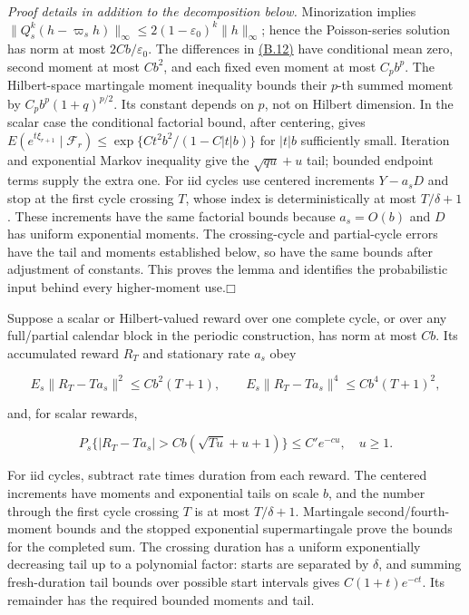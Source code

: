 \documentclass[11pt]{article}
\providecommand{\square}{\mdlgwhtsquare}
\begin{document}
\emph{Proof details in addition to the decomposition below.} Minorization implies
\(\|Q_s^k(h-\varpi_sh)\|_\infty\le 2(1-\varepsilon_0)^k\|h\|_\infty\);
hence the Poisson-series solution has norm at most \(2Cb/\varepsilon_0\). The differences in \hyperref[eq:B.12]{(B.12)} have conditional mean zero, second moment at most \(C b^2\), and each fixed even moment at most \(C_pb^p\). The Hilbert-space martingale moment inequality bounds their \(p\)-th summed moment by \(C_pb^p(1+q)^{p/2}\). Its constant depends on \(p\), not on Hilbert dimension. In the scalar case the conditional factorial bound, after centering, gives
\(E(e^{t\xi_{r+1}}\mid\mathcal F_r)\le
\exp\{C t^2b^2/(1-C|t|b)\}\) for \(|t|b\) sufficiently small.
Iteration and exponential Markov inequality give the \(\sqrt{qu}+u\) tail; bounded endpoint terms supply the extra one. For iid cycles use centered increments \(Y-a_sD\) and stop at the first cycle crossing \(T\), whose index is deterministically at most \(T/\delta+1\). These increments have the same factorial bounds because \(a_s=O(b)\) and \(D\) has uniform exponential moments. The crossing-cycle and partial-cycle errors have the tail and moments established below, so have the same bounds after adjustment of constants. This proves the lemma and identifies the probabilistic input behind every higher-moment use.\hfill$\square$

Suppose a scalar or Hilbert-valued reward over one complete cycle, or over any full/partial calendar block in the periodic construction, has norm at most \(Cb\). Its accumulated reward \(R_T\) and stationary rate \(a_s\) obey

\begin{equation*}
E_s\|R_T-Ta_s\|^2\leq Cb^2(T+1),\qquad
E_s\|R_T-Ta_s\|^4\leq Cb^4(T+1)^2,
\tag{B.10}\label{eq:B.10}
\end{equation*}

and, for scalar rewards,

\begin{equation*}
P_s\{|R_T-Ta_s|>Cb(\sqrt{Tu}+u+1)\}\leq C'e^{-cu},\quad u\geq1.
\tag{B.11}\label{eq:B.11}
\end{equation*}

For iid cycles, subtract rate times duration from each reward. The centered increments have moments and exponential tails on scale \(b\), and the number through the first cycle crossing \(T\) is at most \(T/\delta+1\). Martingale second/fourth-moment bounds and the stopped exponential supermartingale prove the bounds for the completed sum. The crossing duration has a uniform exponentially decreasing tail up to a polynomial factor: starts are separated by \(\delta\), and summing fresh-duration tail bounds over possible start intervals gives \(C(1+t)e^{-ct}\). Its remainder has the required bounded moments and tail.
\end{document}
